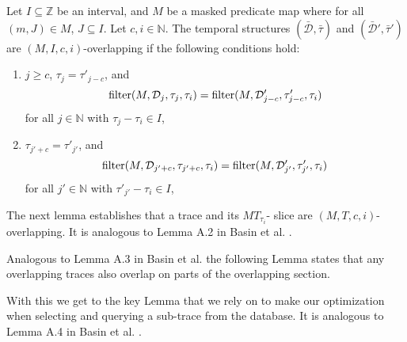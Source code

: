 \begin{definition}
    \label{def:overlapping-ext}
    Let $I \subseteq \mathbb{Z}$ be an interval, and $M$ be a masked predicate map where for all $(m, J) \in M$, $J \subseteq I$.
    Let $c,i \in \mathbb{N}$.
    The temporal structures $(\bar{\mathcal{D}}, \bar{\tau})$ and $(\bar{\mathcal{D}}', \bar{\tau}')$ are $(M,I,c,i)$-overlapping if the following conditions hold:
    \renewcommand{\labelenumi}{\arabic{enumi}.}
    \begin{enumerate}
        \item 
            $j \geq c$,
            $\tau_j = \tau'_{j-c}$,
            and
            \begin{equation*}
                \operatorname{filter}(M, \mathcal{D}_j, \tau_j, \tau_i)
                = \operatorname{filter}(M, \mathcal{D}'_{j-c}, \tau'_{j-c}, \tau_i)
            \end{equation*}
            for all $j \in \mathbb{N}$ with $\tau_j - \tau_i \in I$,
        \item
            $\tau_{j'+c} = \tau'_{j'}$,
            and
            \begin{equation*}
                \operatorname{filter}(M, \mathcal{D}_{j'+c}, \tau_{j'+c}, \tau_i)
                = \operatorname{filter}(M, \mathcal{D}'_{j'}, \tau'_{j'}, \tau_i)
            \end{equation*}
            for all $j' \in \mathbb{N}$ with $\tau'_{j'} - \tau_i \in I$,
    \end{enumerate}
\end{definition}

The next lemma establishes that a trace and its $MT_{\tau_i}$- slice are $(M,T,c,i)$- overlapping.
It is analogous to Lemma A.2 in Basin et al. \cite{Basin2016}.



Analogous to Lemma A.3 in Basin et al. \cite{Basin2016} the following Lemma states that any overlapping traces also overlap on parts of the overlapping section.


With this we get to the key Lemma that we rely on to make our optimization when selecting and querying a sub-trace from the database.
It is analogous to Lemma A.4 in Basin et al. \cite{Basin2016}.




